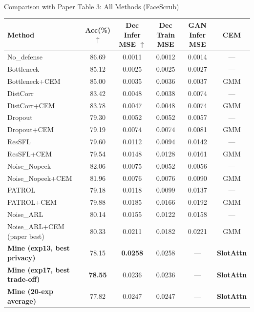 \documentclass[aspectratio=169, 10pt]{beamer}
\begin{document}
\begin{frame}{Comparison with Paper Table 3: All Methods (FaceScrub)}

\vspace{-0.15cm}
\begin{center}
\scriptsize\setlength{\tabcolsep}{3pt}
\renewcommand{\arraystretch}{0.95}
\begin{tabular}{lcc|cc|c}
\toprule
\textbf{Method} & \textbf{Acc(\%)} $\uparrow$ & \textbf{Dec Infer MSE} $\uparrow$ & \textbf{Dec Train MSE} & \textbf{GAN Infer MSE} & \textbf{CEM} \\
\midrule
No\_defense & 86.69 & 0.0011 & 0.0012 & 0.0014 & --- \\
\hdashline
Bottleneck & 85.12 & 0.0025 & 0.0025 & 0.0027 & --- \\
Bottleneck+CEM & 85.00 & 0.0035 & 0.0036 & 0.0037 & GMM \\
\hdashline
DistCorr & 83.42 & 0.0048 & 0.0038 & 0.0074 & --- \\
DistCorr+CEM & 83.78 & 0.0047 & 0.0048 & 0.0074 & GMM \\
\hdashline
Dropout & 79.30 & 0.0052 & 0.0052 & 0.0057 & --- \\
Dropout+CEM & 79.19 & 0.0074 & 0.0074 & 0.0081 & GMM \\
\hdashline
ResSFL & 79.60 & 0.0112 & 0.0094 & 0.0142 & --- \\
ResSFL+CEM & 79.54 & 0.0148 & 0.0128 & 0.0161 & GMM \\
\hdashline
Noise\_Nopeek & 82.06 & 0.0075 & 0.0052 & 0.0056 & --- \\
Noise\_Nopeek+CEM & 81.96 & 0.0076 & 0.0076 & 0.0090 & GMM \\
\hdashline
PATROL & 79.18 & 0.0118 & 0.0099 & 0.0137 & --- \\
PATROL+CEM & 79.88 & 0.0185 & 0.0166 & 0.0192 & GMM \\
\hdashline
Noise\_ARL & 80.14 & 0.0155 & 0.0122 & 0.0158 & --- \\
\rowcolor{red!8}
Noise\_ARL+CEM (paper best) & 80.33 & 0.0211 & 0.0182 & 0.0221 & GMM \\
\midrule
\rowcolor{green!15}
\textbf{Mine (exp13, best privacy)} & 78.15 & \textbf{0.0258} & 0.0258 & --- & \textbf{SlotAttn} \\
\rowcolor{green!10}
\textbf{Mine (exp17, best trade-off)} & \textbf{78.55} & 0.0236 & 0.0236 & --- & \textbf{SlotAttn} \\
\rowcolor{green!8}
\textbf{Mine (20-exp average)} & 77.82 & 0.0247 & 0.0247 & --- & \textbf{SlotAttn} \\
\bottomrule
\end{tabular}
\end{center}

\end{frame}
\end{document}
